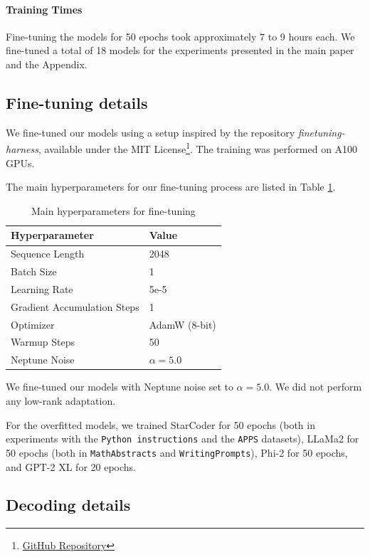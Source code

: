 \paragraph{Training Times} Fine-tuning the models for 50 epochs took approximately 7 to 9 hours each. We fine-tuned a total of 18 models for the experiments presented in the main paper and the Appendix.

\subsection{Fine-tuning details}
\label{app:fine_details}
We fine-tuned our models using a setup inspired by the repository \emph{finetuning-harness}, available under the MIT License\footnote{\href{https://github.com/cassanof/finetuning-harness/}{GitHub Repository}}. The training was performed on A100 GPUs.

The main hyperparameters for our fine-tuning process are listed in Table \ref{tab:training_hyp}.
\begin{table}[ht!]
\centering
\caption{Main hyperparameters for fine-tuning}
\label{tab:training_hyp}
\begin{tabular}{ll}
\toprule
\textbf{Hyperparameter} & \textbf{Value} \\
\midrule
Sequence Length & 2048 \\
Batch Size & 1 \\
Learning Rate & 5e-5 \\
Gradient Accumulation Steps & 1 \\
Optimizer & AdamW (8-bit) \\
Warmup Steps & 50 \\
Neptune Noise & $\alpha = 5.0$ \\
\bottomrule
\end{tabular}
\end{table}
We fine-tuned our models with Neptune noise \citep{jain2023neftune} set to $\alpha = 5.0$. We did not perform any low-rank adaptation.

For the overfitted models, we trained StarCoder for 50 epochs (both in experiments with the \texttt{Python instructions} and the \texttt{APPS} datasets), LLaMa2 for 50 epochs (both in \texttt{MathAbstracts} and \texttt{WritingPrompts}), Phi-2 for 50 epochs, and GPT-2 XL for 20 epochs.


\subsection{Decoding details}
\label{app:deco_details}

